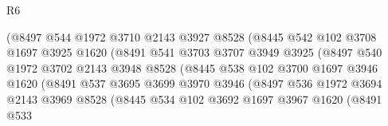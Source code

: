 \begin{lexlean}{R6}
\begin{coremodule}
                                (@8497
                                  @544
                                  @1972
                                  @3710
                                  @2143
                                  @3927
                                  @8528
                                  (@8445
                                    @542
                                    @102
                                    @3708
                                    @1697
                                    @3925
                                    @1620
                                    (@8491
                                      @541
                                      @3703
                                      @3707
                                      @3949
                                      @3925
                                      (@8497
                                        @540
                                        @1972
                                        @3702
                                        @2143
                                        @3948
                                        @8528
                                        (@8445
                                          @538
                                          @102
                                          @3700
                                          @1697
                                          @3946
                                          @1620
                                          (@8491
                                            @537
                                            @3695
                                            @3699
                                            @3970
                                            @3946
                                            (@8497
                                              @536
                                              @1972
                                              @3694
                                              @2143
                                              @3969
                                              @8528
                                              (@8445
                                                @534
                                                @102
                                                @3692
                                                @1697
                                                @3967
                                                @1620
                                                (@8491
                                                  @533

\end{coremodule}
\end{lexlean}
